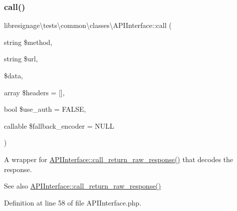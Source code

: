 \subsubsection{\texorpdfstring{call()}{call()}}
{\footnotesize\ttfamily libresignage\textbackslash{}tests\textbackslash{}common\textbackslash{}classes\textbackslash{}\+A\+P\+I\+Interface\+::call (\begin{DoxyParamCaption}\item[{string}]{\$method,  }\item[{string}]{\$url,  }\item[{}]{\$data,  }\item[{array}]{\$headers = {\ttfamily \mbox{[}\mbox{]}},  }\item[{bool}]{\$use\+\_\+auth = {\ttfamily FALSE},  }\item[{callable}]{\$fallback\+\_\+encoder = {\ttfamily NULL} }\end{DoxyParamCaption})}

A wrapper for \hyperlink{classlibresignage_1_1tests_1_1common_1_1classes_1_1APIInterface_ad2962eb1c1c57d2b7c4e76ef376dc595}{A\+P\+I\+Interface\+::call\+\_\+return\+\_\+raw\+\_\+response()} that decodes the response.

\begin{DoxySeeAlso}{See also}
\hyperlink{classlibresignage_1_1tests_1_1common_1_1classes_1_1APIInterface_ad2962eb1c1c57d2b7c4e76ef376dc595}{A\+P\+I\+Interface\+::call\+\_\+return\+\_\+raw\+\_\+response()} 
\end{DoxySeeAlso}


Definition at line 58 of file A\+P\+I\+Interface.\+php.

\mbox{\label{classlibresignage_1_1tests_1_1common_1_1classes_1_1APIInterface_ad2962eb1c1c57d2b7c4e76ef376dc595}} 
